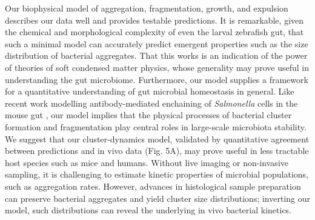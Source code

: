 Our biophysical model of aggregation, fragmentation, growth, and expulsion describes our data well and provides testable predictions. It is remarkable, given the chemical and morphological complexity of even the larval zebrafish gut, that such a minimal model can accurately predict emergent properties such as the size distribution of bacterial aggregates. That this works is an indication of the power of theories of soft condensed matter physics, whose generality may prove useful in understanding the gut microbiome. Furthermore, our model supplies a framework for a quantitative understanding of gut microbial homeostasis in general. Like recent work modelling antibody-mediated enchaining of \textit{Salmonella} cells in the mouse gut \cite{bansept2019enchained}, our model implies that the physical processes of bacterial cluster formation and fragmentation play central roles in large-scale microbiota stability. We suggest that our cluster-dynamics model, validated by quantitative agreement between  predictions and in vivo data (Fig. 5A), may prove useful in less tractable host species such as mice and humans. Without live imaging or non-invasive sampling, it is challenging to estimate kinetic properties of microbial populations, such as aggregation rates. However, advances in histological sample preparation \cite{tropini2017gut} can preserve bacterial aggregates and yield cluster size distributions; inverting our model, such distributions can reveal the underlying in vivo bacterial kinetics.

